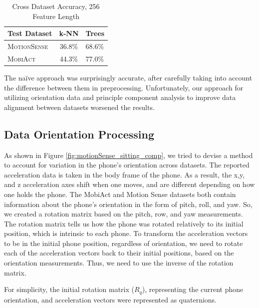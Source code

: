 \begin{table}[H]
\centering
\caption{Cross Dataset Accuracy, 256 Feature Length}
\begin{tabular}{lcl}
\toprule
\multicolumn{1}{l}{\textbf{Test Dataset}} & \multicolumn{1}{c}{\textbf{k-NN}} & \multicolumn{1}{c}{\textbf{Trees}}  \\ \midrule
\textsc{MotionSense}	& 36.8\%	& 68.6\% \\ 
\textsc{MobiAct}	&  44.3\%	& 77.0\% \\
\bottomrule
\end{tabular}
\label{tab:256naive}
\end{table}

The na\"ive approach was surprisingly accurate, after carefully taking into account the difference between them in preprocessing. Unfortunately, our approach for utilizing orientation data and principle component analysis to improve data alignment between datasets worsened the results.

\subsection{Data Orientation Processing}
\label{sub:rotating}

As shown in Figure \ref{fig:motionSense_sitting_comp}, we tried to devise a method to account for variation in the phone's orientation across datasets. The reported acceleration data is taken in the body frame of the phone. As a result, the x,y, and z acceleration axes shift when one moves, and are different depending on how one holds the phone. The MobiAct and Motion Sense datasets both contain information about the phone's orientation in the form of pitch, roll, and yaw. So, we created a rotation matrix based on the pitch, row, and yaw measurements. The rotation matrix tells us how the phone was rotated relatively to its initial position, which is intrinsic to each phone. To transform the acceleration vectors to be in the initial phone position, regardless of orientation, we need to rotate each of the acceleration vectors back to their initial positions, based on the orientation measurements. Thus, we need to use the inverse of the rotation matrix.

For simplicity, the initial rotation matrix ($R_q$), representing the current phone orientation, and acceleration vectors were represented as quaternions.

